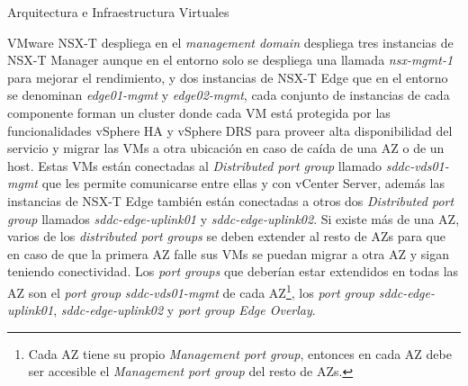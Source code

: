 \begin{subsection}{Arquitectura e Infraestructura Virtuales\cite{CFVirtInfraes}}

VMware NSX-T despliega en el \textit{management domain} despliega tres instancias de NSX-T Manager aunque en el entorno solo se despliega una llamada \textit{nsx-mgmt-1} para mejorar el rendimiento, y dos instancias de NSX-T Edge que en el entorno se denominan \textit{edge01-mgmt} y \textit{edge02-mgmt}, cada conjunto de instancias de cada componente forman un cluster donde cada VM está protegida por las funcionalidades vSphere HA y vSphere DRS para proveer alta disponibilidad del servicio y migrar las VMs a otra ubicación en caso de caída de una AZ o de un host. Estas VMs están conectadas al \textit{Distributed port group} llamado \textit{sddc-vds01-mgmt} que les permite comunicarse entre ellas y con vCenter Server, además las instancias de NSX-T Edge también están conectadas a otros dos \textit{Distributed port group} llamados \textit{sddc-edge-uplink01} y \textit{sddc-edge-uplink02}. Si existe más de una AZ, varios de los \textit{distributed port groups} se deben extender al resto de AZs para que en caso de que la primera AZ falle sus VMs se puedan migrar a otra AZ y sigan teniendo conectividad. Los \textit{port groups} que deberían estar extendidos en todas las AZ son el \textit{port group} \textit{sddc-vds01-mgmt} de cada AZ\footnote{Cada AZ tiene su propio \textit{Management port group}, entonces en cada AZ debe ser accesible el \textit{Management port group} del resto de AZs.}, los \textit{port group} \textit{sddc-edge-uplink01}, \textit{sddc-edge-uplink02} y \textit{port group} \textit{Edge Overlay}.


\end{subsection}
